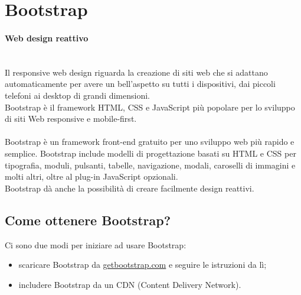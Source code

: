 \documentclass{article}
\begin{document}
\section{Bootstrap}
\paragraph{Web design reattivo} \mbox{} \\
 Il responsive web design riguarda la creazione di siti web che si adattano automaticamente per avere un bell'aspetto su tutti i dispositivi, dai piccoli
telefoni ai desktop di grandi dimensioni. \\ Bootstrap è il framework HTML, CSS e JavaScript più popolare per lo sviluppo di siti Web responsive e mobile-first.
\paragraph{} Bootstrap è un framework front-end gratuito per uno sviluppo web più rapido e semplice. Bootstrap include modelli di progettazione basati su HTML e CSS per tipografia, moduli, pulsanti, tabelle, navigazione, modali, caroselli di immagini e molti altri, oltre al plug-in JavaScript opzionali.
\\ Bootstrap dà anche la possibilità di creare facilmente design reattivi.
\subsection{Come ottenere Bootstrap?}
Ci sono due modi per iniziare ad usare Bootstrap:
\begin{itemize}
    \item scaricare Bootstrap da \url{getbootstrap.com} e seguire le istruzioni da lì;
    \item includere Bootstrap da un CDN (Content Delivery Network).
\end{itemize}
\end{document}
